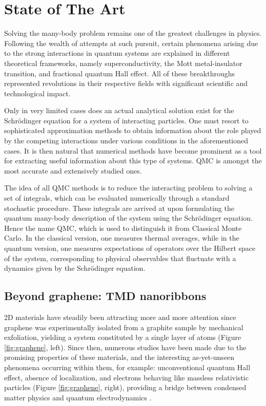 \section{State of The Art}
\label{sec:int_state}

Solving the many-body problem remains one of the greatest challenges in physics.
Following the wealth of attempts at such pursuit, certain phenomena arising due to the strong interactions in quantum systems are explained in different theoretical frameworks, namely superconductivity, the Mott metal-insulator transition, and fractional quantum Hall effect.
All of these breakthroughs represented revolutions in their respective fields with significant scientific and technological impact.

Only in very limited cases does an actual analytical solution exist for the  Schr\"odinger equation for a system of interacting particles.
One must resort to sophisticated approximation methods to obtain  information about the role played by the competing interactions under various conditions in the aforementioned cases.
It is then natural that numerical methods have become prominent as a tool for extracting useful information about this type of systems.
\ac{QMC} is amongst the most accurate and extensively studied ones.

The idea of all \ac{QMC} methods is to reduce the interacting problem to solving a set of integrals, which can be evaluated numerically through a standard stochastic procedure.
These integrals are arrived at upon formulating the quantum many-body description of the system using the Schr\"odinger equation.
Hence the name \acl{QMC}, which is used to distinguish it from Classical Monte Carlo.
In the classical version, one measures thermal averages, while in the quantum version, one measures expectations of operators over the Hilbert space of the system, corresponding to physical observables that fluctuate with a dynamics given by the Schr\"odinger equation.

\subsection{Beyond graphene: TMD nanoribbons}

\ac{2D} materials have steadily been attracting more and more attention since graphene was experimentally isolated from a graphite sample by mechanical exfoliation, yielding a system constituted by a single layer of atoms (Figure \ref{fig:graphene}, left).
Since then, numerous studies have been made due to the promising properties of these materials, and the interesting as-yet-unseen phenomena occurring within them, for example: unconventional quantum Hall effect, absence of localization, and electrons behaving like massless relativistic particles (Figure \ref{fig:graphene}, right), providing a bridge between condensed matter physics and quantum electrodynamics \cite{katsnelson_graphene:_2007}.

